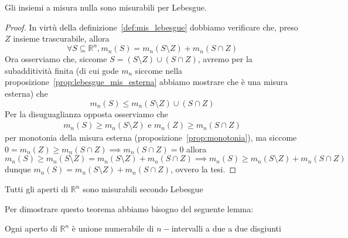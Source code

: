 \begin{cor}
	Gli insiemi a misura nulla sono misurabili per Lebesgue.
	\label{cor:mis_nulla_misur}
\end{cor}
\begin{proof}
In virtù della definizione~\ref{def:mis_lebesgue} dobbiamo verificare che, preso $Z$ insieme trascurabile, allora
$$
\forall S \subseteq \mathbb{R}^n, m_n(S) = m_n(S \setminus Z) + m_n(S \cap Z)
$$
Ora osserviamo che, siccome $S = (S \setminus Z) \cup (S \cap Z)$, avremo per la subadditività finita (di cui gode $m_n$ siccome nella proposizione~\ref{prop:lebesgue_mis_esterna} abbiamo mostrare che è una misura esterna)
che
$$
m_n(S) \leq m_n(S \setminus Z) \cup (S \cap Z)
$$
Per la disuguaglianza opposta osserviamo che
\begin{align*}
m_n(S) \geq m_n(S \setminus Z) \text{ e } m_n(Z) \geq m_n(S \cap Z)
\end{align*}
per monotonia della misura esterna (proposizione~\ref{prop:monotonia}), ma siccome $0=m_n(Z) \geq m_n(S \cap Z) \implies m_n(S \cap Z) = 0$ allora
$$
m_n(S) \geq m_n(S \setminus Z) = m_n(S \setminus Z) + m_n(S \cap Z) \implies m_n(S) \geq m_n(S \setminus Z) + m_n(S \cap Z)
$$
dunque $m_n(S) = m_n(S \setminus Z) + m_n(S \cap Z)$, ovvero la tesi.
\end{proof}
\begin{theorem}
	Tutti gli aperti di $\mathbb{R}^n$ sono misurabili secondo Lebesgue
\end{theorem}
Per dimostrare questo teorema abbiamo bisogno del seguente lemma:
\begin{lemma}
Ogni aperto di $\mathbb{R}^n$ è unione numerabile di $n-$intervalli a due a due disgiunti
\end{lemma}
